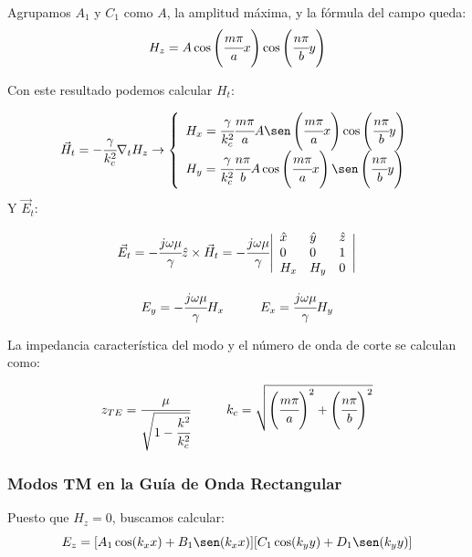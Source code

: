 \documentclass[12pt]{article}
\begin{document}
Agrupamos $A_1$ y $C_1$ como $A$, la amplitud m\'axima, y la f\'ormula del campo queda:
$$H_z = A \cos\left(\cfrac{m\pi}{a}x\right) \cos\left(\cfrac{n\pi}{b}y\right)$$

Con este resultado podemos calcular $H_t$:

$$\vec{H}_t = - \cfrac{\gamma}{k^2_c} \nabla_t H_z \rightarrow \left\{ \begin{array}{l}
        H_x = \cfrac{\gamma}{k^2_c} \cfrac{m\pi}{a} A \sen \left(\cfrac{m\pi}{a}x\right)\cos\left(\cfrac{n\pi}{b}y\right)\\
        H_y = \cfrac{\gamma}{k^2_c} \cfrac{n\pi}{b} A \cos \left(\cfrac{m\pi}{a}x\right)\sen\left(\cfrac{n\pi}{b}y\right)\\
    \end{array}\right.
$$
Y $\vec{E}_t$:

$$\vec{E}_{t} = -\cfrac{j\omega\mu}{\gamma}\hat{z} \times \vec{H}_{t} = -\cfrac{j\omega\mu}{\gamma}
		\Bigg|
	\begin{array}{lll}
		\hat{x} & \hat{y} & \hat{z}\\
		0 & 0 & 1\\
		H_x & H_y & 0
	\end{array}
	\Bigg|
$$

$$E_y = -\cfrac{j\omega\mu}{\gamma} H_x \hspace{1cm} E_x = \cfrac{j\omega\mu}{\gamma} H_y$$

La impedancia caracter\'istica del modo y el n\'umero de onda de corte se calculan como:

$$ z_{TE} = \cfrac{\mu}{\sqrt{1-\cfrac{k^2}{k^2_c}}}\hspace{1cm} k_c = \sqrt{\left(\cfrac{m\pi}{a}\right)^2 + \left(\cfrac{n\pi}{b}\right)^2}$$

\subsubsection{Modos TM en la Gu\'ia de Onda Rectangular}

Puesto que $H_z = 0$, buscamos calcular:
$$E_z = [A_1 \cos(k_xx) + B_1\sen(k_xx)][C_1\cos(k_yy) + D_1\sen(k_yy)]$$
\end{document}
